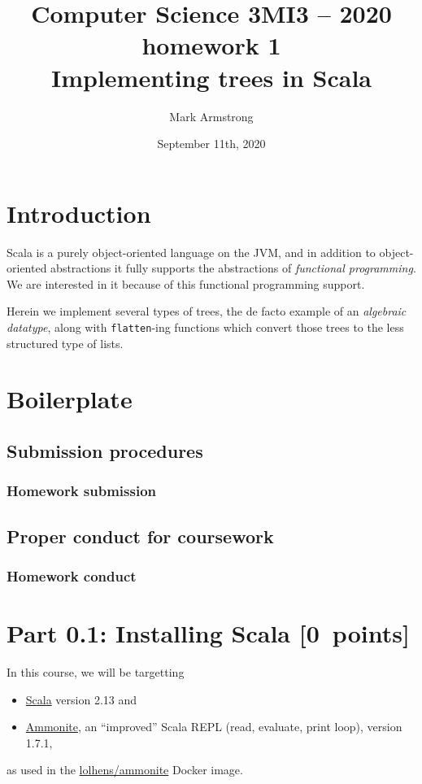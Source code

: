 \documentclass[11pt]{article}
\author{Mark Armstrong}
\date{September 11th, 2020}
\title{Computer Science 3MI3 – 2020 homework 1\\\medskip
\large Implementing trees in Scala}
\begin{document}
\maketitle
\tableofcontents


\section*{Introduction}
\label{sec:org60cd27c}
Scala is a purely object-oriented language on the JVM,
and in addition to object-oriented abstractions
it fully supports the abstractions of \emph{functional programming}.
We are interested in it because of this functional programming support.

Herein we implement several types of trees,
the de facto example of an \emph{algebraic datatype},
along with \texttt{flatten}-ing functions
which convert those trees to the less structured type of lists.

\section*{Boilerplate}
\label{sec:org698cada}
\subsection*{Submission procedures}
\label{sec:orgea1138f}
\subsubsection*{Homework submission}
\label{sec:org6be5327}

\subsection*{Proper conduct for coursework}
\label{sec:org7d3298f}
\subsubsection*{Homework conduct}
\label{sec:org4e7d5d6}

\section*{Part 0.1: Installing Scala                  [0 points]}
\label{sec:orgfc4cb71}
In this course, we will be targetting
\begin{itemize}
\item \href{https://scala-lang.org}{Scala} version 2.13 and
\item \href{https://ammonite.io}{Ammonite}, an “improved” Scala REPL (read, evaluate, print loop),
version 1.7.1,
\end{itemize}
as used in the
\href{https://hub.docker.com/r/lolhens/ammonite/}{lolhens/ammonite}
Docker image.
\end{document}
